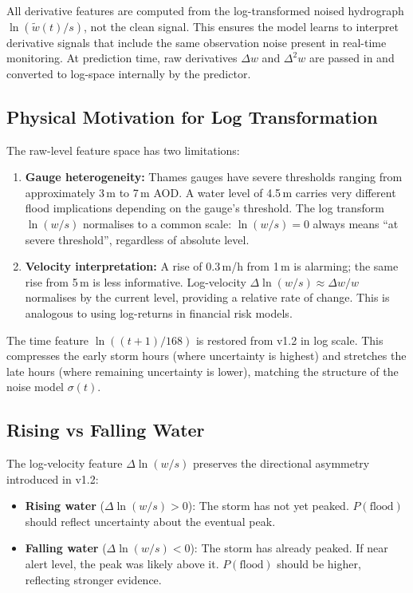 \documentclass[11pt,a4paper]{article}
\begin{document}
\noindent All derivative features are computed from the log-transformed noised
hydrograph $\ln(\tilde{w}(t)/s)$, not the clean signal. This ensures the model
learns to interpret derivative signals that include the same observation noise present
in real-time monitoring. At prediction time, raw derivatives $\Delta w$ and
$\Delta^2 w$ are passed in and converted to log-space internally by the predictor.

\subsection{Physical Motivation for Log Transformation}
The raw-level feature space has two limitations:

\begin{enumerate}[nosep]
    \item \textbf{Gauge heterogeneity:} Thames gauges have severe thresholds ranging
          from approximately 3\,m to 7\,m AOD. A water level of 4.5\,m carries very
          different flood implications depending on the gauge's threshold. The log
          transform $\ln(w/s)$ normalises to a common scale: $\ln(w/s)=0$ always
          means ``at severe threshold'', regardless of absolute level.
    \item \textbf{Velocity interpretation:} A rise of 0.3\,m/h from 1\,m is alarming;
          the same rise from 5\,m is less informative. Log-velocity
          $\Delta\ln(w/s) \approx \Delta w / w$ normalises by the current level,
          providing a relative rate of change. This is analogous to using log-returns
          in financial risk models.
\end{enumerate}

\noindent The time feature $\ln((t{+}1)/168)$ is restored from v1.2 in log scale.
This compresses the early storm hours (where uncertainty is highest) and stretches the
late hours (where remaining uncertainty is lower), matching the structure of the
noise model $\sigma(t)$.

\subsection{Rising vs Falling Water}
The log-velocity feature $\Delta\ln(w/s)$ preserves the directional asymmetry
introduced in v1.2:

\begin{itemize}[nosep]
    \item \textbf{Rising water} ($\Delta\ln(w/s) > 0$): The storm has not yet peaked.
          $P(\text{flood})$ should reflect uncertainty about the eventual peak.
    \item \textbf{Falling water} ($\Delta\ln(w/s) < 0$): The storm has already peaked.
          If near alert level, the peak was likely above it.
          $P(\text{flood})$ should be higher, reflecting stronger evidence.
\end{itemize}
\end{document}
